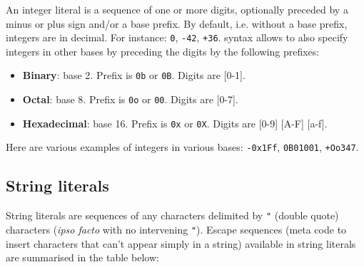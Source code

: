 An integer literal is a sequence of one or more digits, optionally
preceded by a minus or plus sign and/or a base prefix. By default,
i.e. without a base prefix, integers are in decimal. For instance:
{\tt 0}, {\tt -42}, {\tt +36}. {\focal} syntax allows to also specify
integers in other bases by preceding the digits by the following
prefixes:
\begin{itemize}
  \item {\bf Binary}: base 2. Prefix is {\tt 0b} or {\tt 0B}.
    Digits are [0-1].
  \item {\bf Octal}: base 8. Prefix is {\tt 0o} or {\tt 00}.
    Digits are [0-7].
  \item {\bf Hexadecimal}: base 16. Prefix is {\tt 0x} or {\tt 0X}.
    Digits are [0-9] [A-F] [a-f].
\end{itemize}
Here are various examples of integers in various bases:
{\tt -0x1Ff}, {\tt 0B01001}, {\tt +Oo347}.

\subsection{String literals}
\label{string literal}
String literals are sequences of any characters delimited by {\tt "}
(double quote) characters ({\em ipso facto} with no intervening
{\tt"}).
Escape sequences (meta code to insert characters that can't appear
simply in a string) available in string literals are summarised in the
table below:

